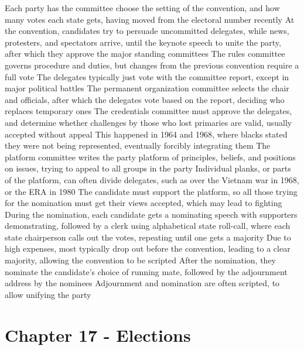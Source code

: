 \documentclass[11 pt, twoside]{article}
\newenvironment{outline*}
{
	\begin{outline}[enumerate]
	}
	{\end{outline}
}
\begin{document}
\begin{outline*}
\1 Each party has the committee choose the setting of the convention, and how many votes each state gets, having moved from the electoral number recently
\2 At the convention, candidates try to persuade uncommitted delegates, while news, protesters, and spectators arrive, until the keynote speech to unite the party, after which they approve the major standing committees
\1 The rules committee governs procedure and duties, but changes from the previous convention require a full vote
\2 The delegates typically just vote with the committee report, except in major political battles
\1 The permanent organization committee selects the chair and officials, after which the delegates vote based on the report, deciding who replaces temporary ones
\1 The credentials committee must approve the delegates, and determine whether challenges by those who lost primaries are valid, usually accepted without appeal
\2 This happened in 1964 and 1968, where blacks stated they were not being represented, eventually forcibly integrating them
\1 The platform committee writes the party platform of principles, beliefs, and positions on issues, trying to appeal to all groups in the party
\2 Individual planks, or parts of the platform, can often divide delegates, such as over the Vietnam war in 1968, or the ERA in 1980
\2 The candidate must support the platform, so all those trying for the nomination must get their views accepted, which may lead to fighting
\1 During the nomination, each candidate gets a nominating speech with supporters demonstrating, followed by a clerk using alphabetical state roll-call, where each state chairperson calls out the votes, repeating until one gets a majority
\2 Due to high expenses, most typically drop out before the convention, leading to a clear majority, allowing the convention to be scripted
\2 After the nomination, they nominate the candidate’s choice of running mate, followed by the adjournment address by the nominees
\2 Adjournment and nomination are often scripted, to allow unifying the party
\end{outline*}
\section{Chapter 17 - Elections}
\end{document}

